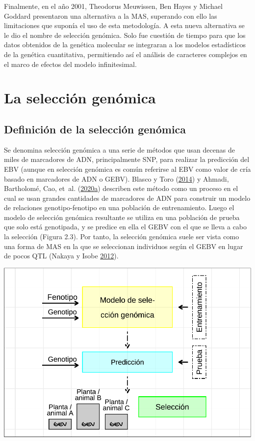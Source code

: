 \documentclass[11pt,spanish,a4paper,oneside,]{book} %
\begin{document}
Finalmente, en el año 2001, Theodorus Meuwissen, Ben Hayes y Michael Goddard presentaron una alternativa a la MAS, superando con ello las limitaciones que suponía el uso de esta metodología. A esta nueva alternativa se le dio el nombre de selección genómica. Solo fue cuestión de tiempo para que los datos obtenidos de la genética molecular se integraran a los modelos estadísticos de la genética cuantitativa, permitiendo así el análisis de caracteres complejos en el marco de efectos del modelo infinitesimal.

\hypertarget{la-selecciuxf3n-genuxf3mica}{%
\section{La selección genómica}\label{la-selecciuxf3n-genuxf3mica}}

\hypertarget{definiciuxf3n-de-la-selecciuxf3n-genuxf3mica}{%
\subsection{Definición de la selección genómica}\label{definiciuxf3n-de-la-selecciuxf3n-genuxf3mica}}

Se denomina selección genómica a una serie de métodos que usan decenas de miles de marcadores de ADN, principalmente SNP, para realizar la predicción del EBV (aunque en selección genómica es común referirse al EBV como valor de cría basado en marcadores de ADN o GEBV). Blasco y Toro (\protect\hyperlink{ref-cite:3}{2014}) y Ahmadi, Bartholomé, Cao, et~al. (\protect\hyperlink{ref-cite:33}{2020}\protect\hyperlink{ref-cite:33}{a}) describen este método como un proceso en el cual se usan grandes cantidades de marcadores de ADN para construir un modelo de relaciones genotipo-fenotipo en una población de entrenamiento. Luego el modelo de selección genómica resultante se utiliza en una población de prueba que solo está genotipada, y se predice en ella el GEBV con el que se lleva a cabo la selección (Figura 2.3). Por tanto, la selección genómica suele ser vista como una forma de MAS en la que se seleccionan individuos según el GEBV en lugar de pocos QTL (Nakaya y Isobe \protect\hyperlink{ref-cite:6}{2012}).

\begin{center}\includegraphics[width=1\linewidth]{figures/GS} \end{center}
\end{document}
